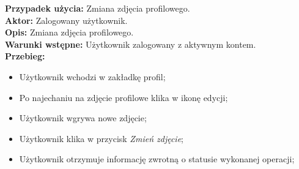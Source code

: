 \noindent
\textbf{Przypadek użycia:} Zmiana zdjęcia profilowego. \\
\textbf{Aktor:} Zalogowany użytkownik. \\
\textbf{Opis:} Zmiana zdjęcia profilowego. \\
\textbf{Warunki wstępne:} Użytkownik zalogowany z aktywnym kontem. \\
\textbf{Przebieg:}
\begin{itemize}[leftmargin=1cm]
    \item Użytkownik wchodzi w zakładkę profil;
    \item Po najechaniu na zdjęcie profilowe klika w ikonę edycji;
    \item Użytkownik wgrywa nowe zdjęcie;
    \item Użytkownik klika w przycisk \textit{Zmień zdjęcie};
    \item Użytkownik otrzymuje informację zwrotną o statusie wykonanej operacji;
\end{itemize}



